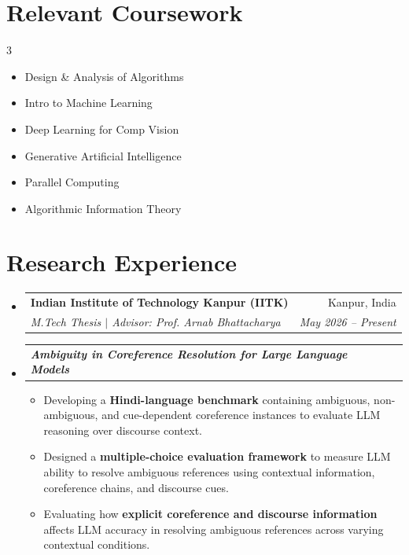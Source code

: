\documentclass[letterpaper,11pt]{article}
\makeatletter
\newcommand{\resumeItem}[1]{
  \item\small{
    {#1 \vspace{-2pt}}
  }
}
\newcommand{\resumeSubheading}[4]{
  \vspace{-2pt}\item
    \begin{tabular*}{0.97\textwidth}[t]{l@{\extracolsep{\fill}}r}
      \textbf{#1} & #2 \\
      \textit{\small#3} & \textit{\small #4} \\
    \end{tabular*}\vspace{-7pt}
}
\newcommand{\resumeProjectHeading}[2]{
    \item
    \begin{tabular*}{0.97\textwidth}{l@{\extracolsep{\fill}}r}
      \small#1 & #2 \\
    \end{tabular*}\vspace{-7pt}
}
\newcommand{\resumeSubHeadingListStart}{\begin{itemize}[leftmargin=0.15in, label={}]}
\newcommand{\resumeSubHeadingListEnd}{\end{itemize}}
\newcommand{\resumeItemListStart}{\begin{itemize}[label={\textbullet}]}
\newcommand{\resumeItemListEnd}{\end{itemize}\vspace{-5pt}}
\makeatother
\begin{document}
\section{Relevant Coursework}
  \vspace{-5pt}
  \begin{multicols}{3}
    \begin{itemize}[leftmargin=0.2in, label={\textbullet}]
      \small
      \item Design \& Analysis of Algorithms
      \item Intro to Machine Learning
      \item Deep Learning for Comp Vision
      \item Generative Artificial Intelligence
      \item Parallel Computing
      \item Algorithmic Information Theory
    \end{itemize}
  \end{multicols}
  \vspace{-10pt}

\section{Research Experience}
  \resumeSubHeadingListStart
    \resumeSubheading
      {Indian Institute of Technology Kanpur (IITK)}{Kanpur, India}
      {M.Tech Thesis $|$ Advisor: Prof. Arnab Bhattacharya}{May 2026 -- Present}
    \resumeProjectHeading
      {\textit{\textbf{Ambiguity in Coreference Resolution for Large Language Models}}}{}
      \resumeItemListStart
        \resumeItem{Developing a \textbf{Hindi-language benchmark} containing ambiguous, non-ambiguous, and cue-dependent coreference instances to evaluate LLM reasoning over discourse context.}
        \resumeItem{Designed a \textbf{multiple-choice evaluation framework} to measure LLM ability to resolve ambiguous references using contextual information, coreference chains, and discourse cues.}
        \resumeItem{Evaluating how \textbf{explicit coreference and discourse information} affects LLM accuracy in resolving ambiguous references across varying contextual conditions.}
      \resumeItemListEnd
  \resumeSubHeadingListEnd
\end{document}
